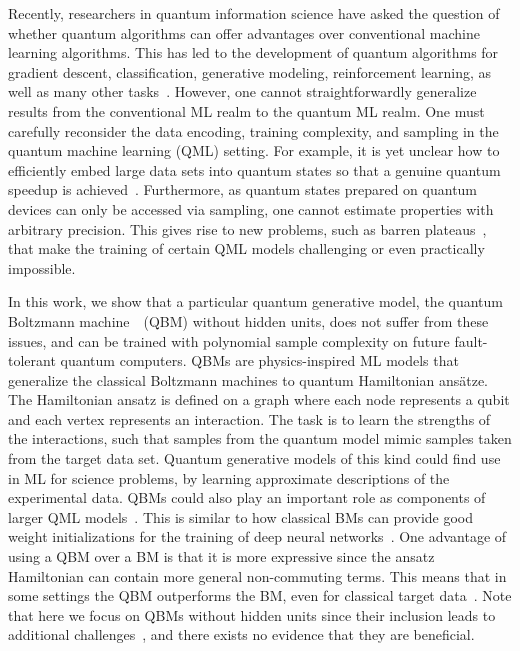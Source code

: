 \documentclass[
    aps,
    prx,
    floatfix,
    nofootinbib,
    onecolumn
]{revtex4-2}
\begin{document}
Recently, researchers in quantum information science have asked the question of whether quantum algorithms can offer advantages over conventional machine learning algorithms. This has led to the development of quantum algorithms for gradient descent, classification, generative modeling, reinforcement learning, as well as many other tasks~\cite{Dunjko_2018, Ciliberto_2018, Benedetti_2019, Lamata_2020, Cerezo_2022}. However, one cannot straightforwardly generalize results from the conventional ML realm to the quantum ML realm. One must carefully reconsider the data encoding, training complexity, and sampling in the quantum machine learning (QML) setting. For example, it is yet unclear how to efficiently embed large data sets into quantum states so that a genuine quantum speedup is achieved~\cite{Aaronson_2015, Hoefler_2023}. Furthermore, as quantum states prepared on quantum devices can only be accessed via sampling, one cannot estimate properties with arbitrary precision. This gives rise to new problems, such as barren plateaus~\cite{McClean_2018, Grant2019initialization, Cerezo_2021, Marrero_2021, CerveroMartin2023, rudolph2023trainability}, that make the training of certain QML models challenging or even practically impossible.

In this work, we show that a particular quantum generative model, the quantum Boltzmann machine~\cite{Amin_2018, Benedetti_2017, Kieferova_2017, Kappen_2020}~(QBM) without hidden units, does not suffer from these issues, and can be trained with polynomial sample complexity on future fault-tolerant quantum computers. QBMs are physics-inspired ML models that generalize the classical Boltzmann machines to quantum Hamiltonian ans{\"a}tze. The Hamiltonian ansatz is defined on a graph where each node represents a qubit and each vertex represents an interaction. The task is to learn the strengths of the interactions, such that samples from the quantum model mimic samples taken from the target data set. Quantum generative models of this kind could find use in ML for science problems, by learning approximate descriptions of the experimental data. QBMs could also play an important role as components of larger QML models~\cite{Benedetti_2018, Khoshaman_2019, Crawford_2019, Wilson_2021, Wang_2021}. This is similar to how classical BMs can provide good weight initializations for the training of deep neural networks~\cite{Hinton_2006}. One advantage of using a QBM over a BM is that it is more expressive since the ansatz Hamiltonian can contain more general non-commuting terms. This means that in some settings the QBM outperforms the BM, even for classical target data~\cite{Kappen_2020}. Note that here we focus on QBMs without hidden units since their inclusion leads to additional challenges~\cite{Wiebe_2019, Kieferova_2021, Marrero_2021}, and there exists no evidence that they are beneficial.
\end{document}
